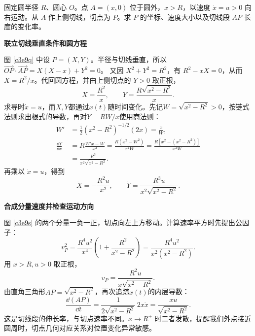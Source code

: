 \begin{question}
\begin{example}[移动切线的切点]
固定圆半径 $R$、圆心 $O$。点 $A=(x,0)$ 位于圆外，$x>R$，以速度 $\dot x=u>0$ 向右运动。从 $A$ 作上侧切线，切点为 $P$。求 $P$ 的坐标、速度大小以及切线段 $AP$ 长度的变化率。
\end{example}
\end{question}
\begin{solution}\textbf{联立切线垂直条件和圆方程}\par\nobreak
图 \ref{c3e9q} 中设 $P=(X,Y)$。半径与切线垂直，所以
$\overrightarrow{OP}\cdot\overrightarrow{AP}=X(X-x)+Y^2=0$。
又因 $X^2+Y^2=R^2$，有 $R^2-xX=0$，从而 $X=R^2/x$。代回圆方程，并由上侧切点的 $Y>0$ 取正根，
\[
 X=\frac{R^2}{x},\qquad Y=\frac{R\sqrt{x^2-R^2}}x.
\]
求导时$\dot x=u$，而$X,Y$都通过$x(t)$随时间变化。先记$W=\sqrt{x^2-R^2}>0$，按链式法则求出根式的导数，再对$Y=RW/x$使用商法则：
\begin{align*}
W'&=\frac12(x^2-R^2)^{-1/2}(2x)=\frac xW,\\
\frac{\dd Y}{\dd x}
&=R\frac{W'x-W}{x^2}
=\frac{R(x^2-W^2)}{x^2W}
=\frac{R[x^2-(x^2-R^2)]}{x^2W}\\
&=\frac{R^3}{x^2\sqrt{x^2-R^2}}.
\end{align*}
再乘以 $\dot x=u$，得到
\[
 \dot X=-\frac{R^2u}{x^2},\qquad
 \dot Y=\frac{R^3u}{x^2\sqrt{x^2-R^2}}.
\]



\par\medskip{}\noindent\textbf{合成分量速度并检查运动方向}\par\nobreak
图 \ref{c3e9s} 的两个分量一负一正，切点向左上方移动。计算速率平方时先提出公因子：
\[
 v_P^2=\frac{R^4u^2}{x^4}
 \left(1+\frac{R^2}{x^2-R^2}\right)
 =\frac{R^4u^2}{x^2(x^2-R^2)}.
\]
用 $x>R,u>0$ 取正根，
\[
 \boxed{v_P=\frac{R^2u}{x\sqrt{x^2-R^2}}}.
\]
由直角三角形$AP=\sqrt{x^2-R^2}$，再次追踪$x(t)$的内层导数：
\[
\frac{\dd(AP)}{\dd t}
=\frac{1}{2\sqrt{x^2-R^2}}\,2x\dot x
=\frac{xu}{\sqrt{x^2-R^2}}.
\]
这是切线段的伸长率，与切点速率不同。$x\to R^+$ 时二者发散，提醒我们外点接近圆周时，切点几何对应关系对位置变化异常敏感。
\end{solution}
